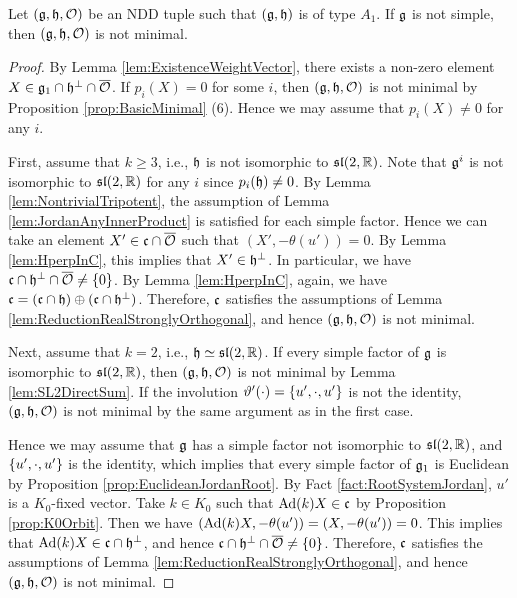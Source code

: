 \begin{theorem} \label{thm:NonMinimalTypeASemisimple}
	Let $(\mathfrak{g}, \mathfrak{h}, \mathcal{O})$ be an NDD tuple such that $(\mathfrak{g}, \mathfrak{h})$ is of type $A_1$.
	If $\mathfrak{g}$ is not simple, then $(\mathfrak{g}, \mathfrak{h}, \mathcal{O})$ is not minimal.
\end{theorem}

\begin{proof}
	By Lemma \ref{lem:ExistenceWeightVector}, there exists a non-zero element $X \in \mathfrak{g}_1 \cap \mathfrak{h}^\perp \cap \overline{\mathcal{O}}$.
	If $p_i(X) = 0$ for some $i$, then $(\mathfrak{g}, \mathfrak{h}, \mathcal{O})$ is not minimal by Proposition \ref{prop:BasicMinimal} (6).
	Hence we may assume that $p_i(X) \neq 0$ for any $i$.

	First, assume that $k \geq 3$, i.e., $\mathfrak{h}$ is not isomorphic to $\mathfrak{sl}(2,\mathbb{R})$.
	Note that $\mathfrak{g}^i$ is not isomorphic to $\mathfrak{sl}(2,\mathbb{R})$ for any $i$ since $p_i(\mathfrak{h}) \neq 0$.
	By Lemma \ref{lem:NontrivialTripotent}, the assumption of Lemma \ref{lem:JordanAnyInnerProduct} is satisfied for each simple factor.
	Hence we can take an element $X' \in \mathfrak{c} \cap \overline{\mathcal{O}}$ such that $(X', -\theta(u')) = 0$.
	By Lemma \ref{lem:HperpInC}, this implies that $X' \in \mathfrak{h}^\perp$.
	In particular, we have  $\mathfrak{c} \cap \mathfrak{h}^\perp \cap \overline{\mathcal{O}} \neq \left\{0 \right\}$.
	By Lemma \ref{lem:HperpInC}, again, we have $\mathfrak{c} = (\mathfrak{c}\cap \mathfrak{h}) \oplus (\mathfrak{c} \cap \mathfrak{h}^\perp)$.
	Therefore, $\mathfrak{c}$ satisfies the assumptions of Lemma \ref{lem:ReductionRealStronglyOrthogonal}, and hence $(\mathfrak{g}, \mathfrak{h}, \mathcal{O})$ is not minimal.

	Next, assume that $k = 2$, i.e., $\mathfrak{h} \simeq \mathfrak{sl}(2,\mathbb{R})$.
	If every simple factor of $\mathfrak{g}$ is isomorphic to $\mathfrak{sl}(2,\mathbb{R})$, then $(\mathfrak{g}, \mathfrak{h}, \mathcal{O})$ is not minimal by Lemma \ref{lem:SL2DirectSum}.
	If the involution $\vartheta'(\cdot) = \{u', \cdot, u'\}$ is not the identity, $(\mathfrak{g}, \mathfrak{h}, \mathcal{O})$ is not minimal by the same argument as in the first case.
	
	Hence we may assume that $\mathfrak{g}$ has a simple factor not isomorphic to $\mathfrak{sl}(2,\mathbb{R})$, and $\{u', \cdot, u'\}$ is the identity, which implies that every simple factor of $\mathfrak{g}_1$ is Euclidean by Proposition \ref{prop:EuclideanJordanRoot}.
	By Fact \ref{fact:RootSystemJordan}, $u'$ is a $K_0$-fixed vector.
	Take $k \in K_0$ such that $\mathrm{Ad}(k)X \in \mathfrak{c}$ by Proposition \ref{prop:K0Orbit}.
	Then we have $(\mathrm{Ad}(k)X, -\theta(u')) = (X, -\theta(u')) = 0$.
	This implies that $\mathrm{Ad}(k)X \in \mathfrak{c} \cap \mathfrak{h}^\perp$, and hence $\mathfrak{c}\cap \mathfrak{h}^\perp \cap \overline{\mathcal{O}} \neq \left\{0 \right\}$.
	Therefore, $\mathfrak{c}$ satisfies the assumptions of Lemma \ref{lem:ReductionRealStronglyOrthogonal}, and hence $(\mathfrak{g}, \mathfrak{h}, \mathcal{O})$ is not minimal.
\end{proof}